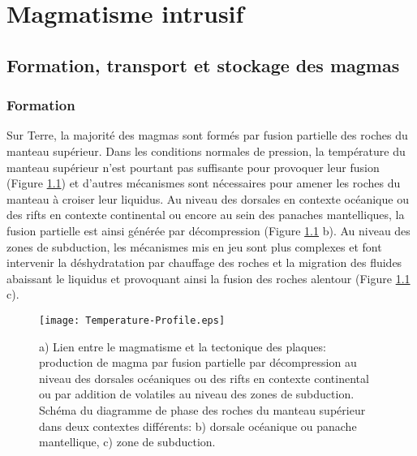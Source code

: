 \chapter{Magmatisme intrusif}
\label{chap1}
\minitoc

\section{Formation, transport et stockage des magmas}
\label{C1-sec:magm-intr-un}

\subsection{Formation}
\label{C1-sec:formation-1}

Sur Terre, la majorité des magmas sont formés par fusion partielle des
roches  du  manteau  supérieur.    Dans  les  conditions  normales  de
pression,  la  température du  manteau  supérieur  n'est pourtant  pas
suffisante pour  provoquer leur  fusion (Figure  \ref{C1-Geoterme}) et
d'autres mécanismes sont nécessaires pour amener les roches du manteau
à croiser leur liquidus.  Au niveau des dorsales en contexte océanique
ou des  rifts en contexte continental  ou encore au sein  des panaches
mantelliques, la fusion partielle  est ainsi générée par décompression
(Figure \ref{C1-Geoterme} b).  Au niveau  des zones de subduction, les
mécanismes  mis en  jeu  sont  plus complexes  et  font intervenir  la
déshydratation par  chauffage des roches  et la migration  des fluides
abaissant  le  liquidus  et  provoquant ainsi  la  fusion  des  roches
alentour (Figure \ref{C1-Geoterme} c).

\begin{figure}[htpb]
  \begin{center}
    \graphicspath{ {/Users/thorey/Documents/These/Manuscript/Figure/Chapter1/} }
    \texttt{[image: Temperature-Profile.eps]}
    \caption{a) Lien entre le magmatisme et la tectonique des plaques:
      production de  magma par  fusion partielle par  décompression au
      niveau  des  dorsales  océaniques   ou  des  rifts  en  contexte
      continental ou par addition de  volatiles au niveau des zones de
      subduction. Schéma du  diagramme de phase des  roches du manteau
      supérieur dans  deux contextes différents: b)  dorsale océanique
      ou panache mantellique, c) zone de subduction.}
    \label{C1-Geoterme}
  \end{center}
\end{figure}

